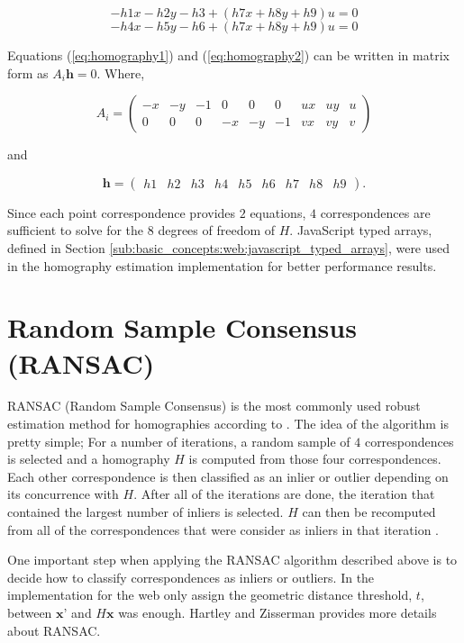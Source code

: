\begin{equation}
\label{eq:homography1}
-h1x-h2y-h3 +(h7x+h8y+h9)u=0
\end{equation}
\begin{equation}
\label{eq:homography2}
-h4x-h5y-h6 +(h7x+h8y+h9)u=0
\end{equation}

Equations (\ref{eq:homography1}) and (\ref{eq:homography2}) can be written in matrix form as $A_i\textbf{h}=0$. Where,

$$A_i=\begin{pmatrix}-x & -y & -1 & 0 & 0 & 0 & ux & uy & u\\0 & 0 & 0 & -x & -y & -1 & vx & vy & v\end{pmatrix}$$

and

$$\textbf{h}=\begin{pmatrix}h1 & h2 & h3 & h4 & h5 & h6 & h7 & h8 & h9\end{pmatrix}.$$

Since each point correspondence provides $2$ equations, $4$ correspondences are sufficient to solve for the $8$ degrees of freedom of $H$. JavaScript typed arrays, defined in Section \ref{sub:basic_concepts:web:javascript_typed_arrays}, were used in the homography estimation implementation for better performance results.


\section{Random Sample Consensus (RANSAC)} %

RANSAC (Random Sample Consensus) \cite{Hartley2004} is the most commonly used robust estimation method for homographies according to \cite{Homography2009}. The idea of the algorithm is pretty simple; For a number of iterations, a random sample of $4$ correspondences is selected and a homography $H$ is computed from those four correspondences. Each other correspondence is then classified as an inlier or outlier depending on its concurrence with $H$. After all of the iterations are done, the iteration that contained the largest number of inliers is selected. $H$ can then be recomputed from all of the correspondences that were consider as inliers in that iteration \cite{Homography2009}.

One important step when applying the RANSAC algorithm described above is to decide how to classify correspondences as inliers or outliers. In the implementation for the web only assign the geometric distance \cite{Homography2009} threshold, $t$, between $\textbf{x'}$ and $H\textbf{x}$ was enough. Hartley and Zisserman \cite{Hartley2004} provides more details about RANSAC.

